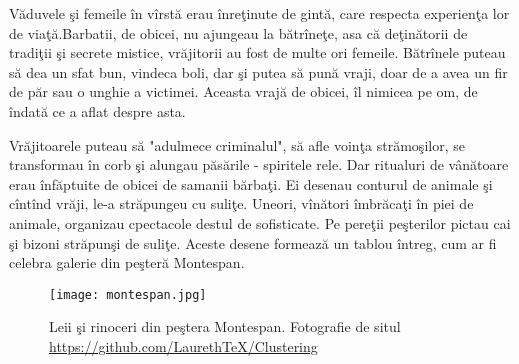 Văduvele şi femeile în vîrstă erau înreţinute de gintă, care respecta experienţa lor de viaţă.Barbatii, de obicei, nu ajungeau la bătrîneţe, asa că deţinătorii de tradiţii şi secrete mistice, vrăjitorii  au fost de multe ori femeile. Bătrînele  puteau să dea un sfat bun, vindeca boli, dar şi putea să pună vraji, doar de a avea un fir de păr sau o unghie a victimei. Aceasta vrajă  de obicei, îl nimicea pe om, de îndată ce a aflat despre asta.

Vrăjitoarele puteau să "adulmece criminalul", să afle voinţa strămoşilor, se transformau în corb şi alungau păsările - spiritele rele. Dar ritualuri de vânătoare erau înfăptuite de obicei de samanii bărbaţi. Ei desenau conturul de animale şi cîntînd vrăji, le-a străpungeu cu suliţe. Uneori, vînători îmbrăcaţi în piei de animale, organizau cpectacole destul de sofisticate. Pe pereţii peşterilor pictau cai şi bizoni străpunşi de suliţe. Aceste desene formează un tablou întreg, cum ar fi celebra galerie din peşteră Montespan. \begin{wrapfigure}[24]{l}{0.3\linewidth} 
    \texttt{[image: montespan.jpg]}
    \caption{Leii şi rinoceri din peştera Montespan. Fotografie de situl \url{https://github.com/LaurethTeX/Clustering} }
    \label{fig:pca}
\end{wrapfigure}